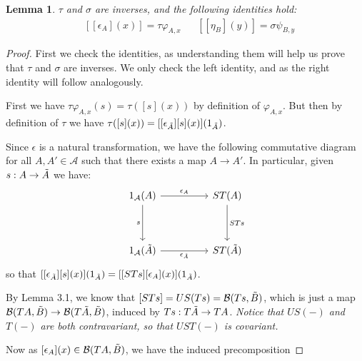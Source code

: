 \documentclass[12pt,a4paper]{article}
\newtheorem{lemma}{Lemma}[section] %
\def\HomB{\ensuremath\mathcal{B}}
\def\t{\ensuremath\tilde}
\begin{document}
\begin{lemma}
	$\tau$ and $\sigma$ are inverses, and the following identities hold:
	\begin{align*}
		&[[\epsilon_A](x)] = \tau \varphi_{A,x}& & [[\eta_B](y)]= \sigma \psi_{B,y}
	\end{align*}
\end{lemma}
\begin{proof}
	First we check the identities, as understanding them will help us prove that $\tau$ and $\sigma$ are inverses. We only check the left identity, and as the right identity will follow analogously. 
	
	First we have $\tau \varphi_{A,x}(s) = \tau([s](x))$ by definition of $\varphi_{A,x}$. But then by definition of $\tau$ we have $\tau([s](x)) = [[\epsilon_{\t A}][s](x)](1_{\t A})$. 
	
	Since $\epsilon$ is a natural transformation, we have the following commutative diagram for all $A, A' \in \mathcal{A}$ such that there exists a map $A \to A'$. In particular, given $s: A \to \t A$ we have:
\[\begin{tikzcd}
	{1_\mathcal{A}(A)} && {ST(A)} \\
	\\
	{1_\mathcal{A}(\t A)} && {ST(\t A)}
	\arrow["{\epsilon_A}", from=1-1, to=1-3]
	\arrow["s"', from=1-1, to=3-1]
	\arrow["STs", from=1-3, to=3-3]
	\arrow["{\epsilon_{\t A}}"', from=3-1, to=3-3]
\end{tikzcd}\]
so that $[[\epsilon_{\t A}][s](x)](1_{\t A}) = [[STs][\epsilon_A](x)](1_{\t A})$. 

By Lemma 3.1, we know that $[STs] = US(Ts)  = \HomB(Ts, \t B)$, which is just a map  $\HomB(TA, \t B) \to \HomB(T\t A, \t B)$, induced by $Ts: T\t A \to TA$. \emph{Notice that $US(-)$ and $T(-)$ are both contravariant, so that $UST(-)$ is covariant. }

Now as  $[\epsilon_A](x) \in \HomB(TA, \t B)$, we have the induced precomposition


\end{proof}
\end{document}
